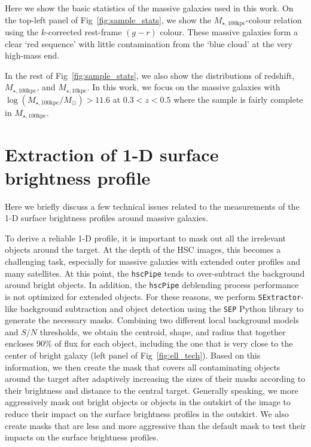 \documentclass[fleqn,usenatbib]{mnras}
\def\minn{{$M_{\star,10\mathrm{kpc}}$}}
\def\mtot{{$M_{\star,100\mathrm{kpc}}$}}
\def\logmtot{{$\log (M_{\star,100\mathrm{kpc}}/M_{\odot})$}}
\begin{document}
    Here we show the basic statistics of the massive galaxies used in this work.
    On the top-left panel of Fig~\ref{fig:sample_stats}, we show the \mtot{}-colour 
    relation using the $k$-corrected rest-frame $(g-r)$ colour. 
    These massive galaxies form a clear `red sequence' with little contamination 
    from the `blue cloud' at the very high-mass end.
    
    In the rest of Fig~\ref{fig:sample_stats}, we also show the distributions of 
    redshift, \mtot{}, and \minn{}.
    In this work, we focus on the massive galaxies with \logmtot{}$>11.6$ at 
    $0.3 < z < 0.5$ where the sample is fairly complete in \mtot{}.
    
\section{Extraction of 1-D surface brightness profile} 
    \label{app:ellipse} 
    
    Here we briefly discuss a few technical issues related to the measurements of the 
    1-D surface brightness profiles around massive galaxies. 
    
    To derive a reliable 1-D profile, it is important to mask out all the irrelevant 
    objects around the target.
    At the depth of the HSC images, this becomes a challenging task, especially 
    for massive galaxies with extended outer profiles and many satellites. 
    At this point, the \texttt{hscPipe} tends to over-subtract the background around 
    bright objects.  
    In addition, the \texttt{hscPipe} deblending process performance is not optimized 
    for extended objects. 
    For these reasons, we perform \texttt{SExtractor}-like background subtraction and 
    object detection using the \texttt{SEP} Python library to generate the necessary 
    masks.
    Combining two different local background models and $S/N$ thresholds, we obtain 
    the centroid, shape, and radius that together encloses 90\% of flux for each 
    object, including the one that is very close to the center of bright galaxy 
    (left panel of Fig~\ref{fig:ell_tech}). 
    Based on this information, we then create the mask that covers all contaminating 
    objects around the target after adaptively increasing the sizes of their masks 
    according to their brightness and distance to the central target. 
    Generally speaking, we more aggressively mask out bright objects or objects in 
    the outskirt of the image to reduce their impact on the surface brightness 
    profiles in the outskirt. 
    We also create masks that are less and more aggressive than the default mask to 
    test their impacts on the surface brightness profiles. 
    
\end{document}
